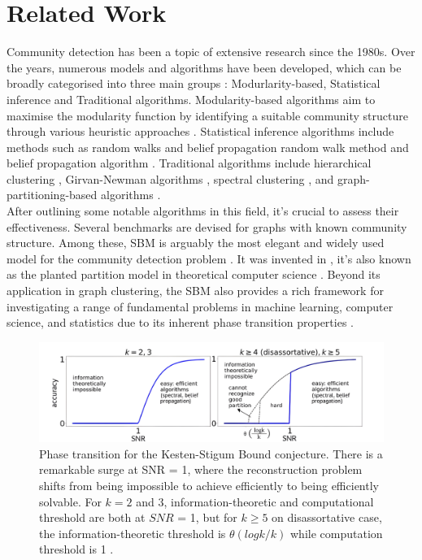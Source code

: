 \section{Related Work}
Community detection has been a topic of extensive research since the 1980s. Over the years, numerous models and algorithms have been developed, which can be broadly categorised into three main groups \cite{review_algo}: Modurlarity-based, Statistical inference and Traditional algorithms. Modularity-based algorithms aim to maximise the modularity function by identifying a suitable community structure through various heuristic approaches  \cite{review_1_modu_Newman} \cite{review_2_modu_Newman}. Statistical inference algorithms include methods such as random walks and belief propagation random walk method and belief propagation algorithm\cite{TheSurvey} \cite{TheConjecture}. Traditional algorithms include hierarchical clustering \cite{comm_dete_in_graphs}, Girvan-Newman algorithms \cite{review_Newman}, spectral clustering \cite{spec_review_1} \cite{spec_review_2}, and graph-partitioning-based algorithms \cite{partition_review}.\\
After outlining some notable algorithms in this field, it's crucial to assess their effectiveness. Several benchmarks are devised for graphs with known community structure. Among these, SBM is arguably the most elegant and widely used model for the community detection problem \cite{TheConjecture} \cite{userguide}. It was invented in \cite{sbm-review_1}, it's also known as the planted partition model in theoretical computer science \cite{df89}. Beyond its application in graph clustering, the SBM also provides a rich framework for investigating a range of fundamental problems in machine learning, computer science, and statistics due to its inherent phase transition properties \cite{TheConjecture} \cite{Emmanuel_sbm}. \\
\begin{figure}[ht]
    \centering
    \includegraphics[width=1.1\linewidth]{Figures/phase_trans.jpg}
    \caption[Phase Transition for the Kesten-Stigum Bound Conjecture]{Phase transition for the Kesten-Stigum Bound conjecture. There is a remarkable surge at SNR = 1, where the reconstruction problem shifts from being impossible to achieve efficiently to being efficiently solvable. For $k=2$ and $3$, information-theoretic and computational threshold are both at $SNR$ = 1, but for $k\geq5$ on disassortative case, the information-theoretic threshold is $\theta(logk/k)$ while computation threshold is 1 \cite{TheSurvey}.}
    \label{fig:phase_trans}
\end{figure}
